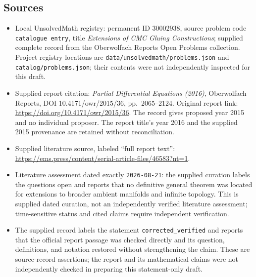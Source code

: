 \documentclass[11pt]{article}
\begin{document}
\subsection{Sources}
\begin{itemize}
\item Local UnsolvedMath registry: permanent ID \(30002938\), source problem code \texttt{catalogue entry}, title \emph{Extensions of CMC Gluing Constructions}; supplied complete record from the Oberwolfach Reports Open Problems collection. Project registry locations are \texttt{data/unsolvedmath/problems.json} and \texttt{catalog/problems.json}; their contents were not independently inspected for this draft.
\item Supplied report citation: \emph{Partial Differential Equations (2016)}, Oberwolfach Reports, DOI 10.4171/owr/2015/36, pp.\ 2065--2124. Original report link: \url{https://doi.org/10.4171/owr/2015/36}. The record gives proposed year 2015 and no individual proposer. The report title's year 2016 and the supplied 2015 provenance are retained without reconciliation.
\item Supplied literature source, labeled ``full report text'': \url{https://ems.press/content/serial-article-files/46583?nt=1}.
\item Literature assessment dated exactly \texttt{2026-08-21}: the supplied curation labels the questions open and reports that no definitive general theorem was located for extensions to broader ambient manifolds and infinite topology. This is supplied dated curation, not an independently verified literature assessment; time-sensitive status and cited claims require independent verification.
\item The supplied record labels the statement \texttt{corrected\_verified} and reports that the official report passage was checked directly and its question, definitions, and notation restored without strengthening the claim. These are source-record assertions; the report and its mathematical claims were not independently checked in preparing this statement-only draft.
\end{itemize}
\end{document}
